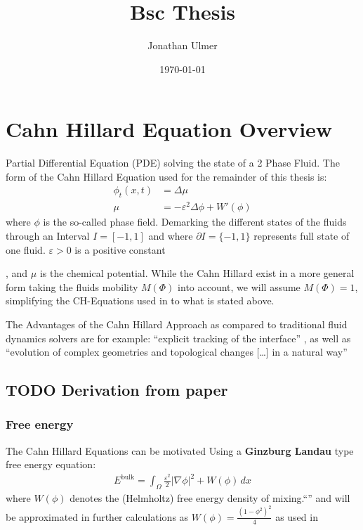 \documentclass[11pt]{article}
\author{Jonathan Ulmer}
\date{\today}
\title{Bsc Thesis}
\begin{document}
\maketitle
\tableofcontents

\section{Cahn Hillard Equation Overview}
\label{sec:org0c2381e}
Partial Differential Equation (PDE) solving the state of a 2 Phase Fluid\autocite{Wu_2022}. The form of the Cahn Hillard Equation used for the remainder of this thesis is:
\begin{align}
\phi _t(x,t) &=  \Delta  \mu \\
\mu &= - \varepsilon^2 \Delta \phi   + W'(\phi)
\end{align}
where \(\phi\) is the so-called phase field. Demarking the different states of the fluids through an Interval \(I=[-1,1]\) and where \(\partial I = \{-1,1\}\)  represents full state of one fluid. \(\varepsilon > 0\) is  a positive constant

, and \(\mu\) is the chemical potential\autocite{Wu_2022}. While the Cahn Hillard exist in a more general form taking the fluids mobility \(M(\Phi)\) into account, we will assume \(M(\Phi) = 1\), simplifying the CH-Equations used in\autocite{Wu_2022}\autocite{SHIN20117441} to what is stated above.


The Advantages of the Cahn Hillard Approach as compared to traditional fluid dynamics solvers are for example: ``explicit tracking of the interface'' \autocite{Wu_2022}, as well as ``evolution of complex geometries and topological changes [\ldots{}] in a natural way'' \autocite{Wu_2022}
\subsection{{\bfseries\sffamily TODO} Derivation from paper}
\label{sec:orgc261a42}
\subsubsection{Free energy}
\label{sec:org9bc3c54}
The Cahn Hillard Equations can be motivated Using a \textbf{Ginzburg Landau} type free energy equation:
\begin{align*}
E^{\text{bulk}}  = \int_{  \Omega}  \frac{\varepsilon^2}{2} |\nabla \phi |^2 + W(\phi) \,dx
\end{align*}
where \(W(\phi)\) denotes the (Helmholtz) free energy density of mixing.``'' \autocite{Wu_2022} and will be approximated in further calculations as \(W(\phi) = \frac{(1-\phi ^2)^2}{4}\) as used in\autocite{SHIN20117441}
\end{document}
